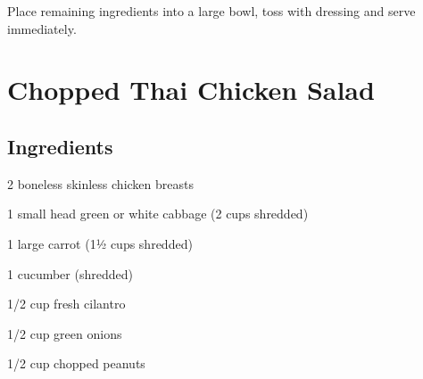 \documentclass[letterpaper,10pt,english]{sphinxmanual}
\begin{document}
Place remaining ingredients into a large bowl, toss with dressing and serve immediately.


\chapter{Chopped Thai Chicken Salad}
\label{\detokenize{Chopped_Thai_Cluck_Salad:chopped-thai-chicken-salad}}\label{\detokenize{Chopped_Thai_Cluck_Salad::doc}}

\section{Ingredients}
\label{\detokenize{Chopped_Thai_Cluck_Salad:ingredients}}

%
\begin{sphinxVerbatim}[commandchars=\\\{\}]
2 boneless skinless chicken breasts

1 small head green or white cabbage (2 cups shredded)

1 large carrot (1½ cups shredded)

1 cucumber (shredded)

1/2 cup fresh cilantro

1/2 cup green onions

1/2 cup chopped peanuts
\end{sphinxVerbatim}


%
\begin{sphinxVerbatim}[commandchars=\\\{\}]
  

 

   

  

  

    

  

   

   

  
\end{sphinxVerbatim}
\end{document}
